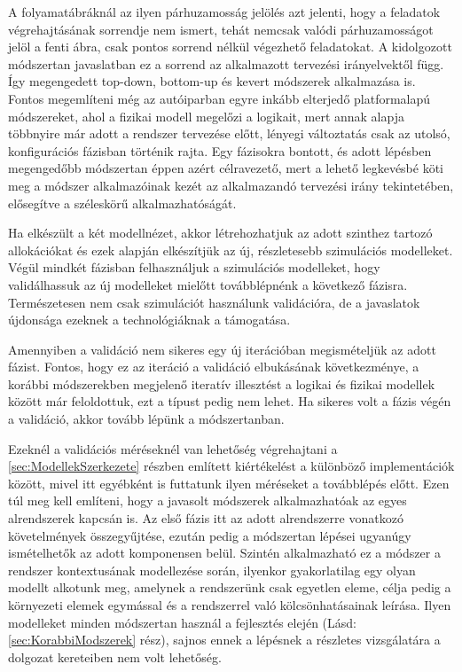         A folyamatábráknál az ilyen párhuzamosság jelölés azt jelenti, hogy a feladatok végrehajtásának sorrendje nem ismert, tehát nemcsak valódi párhuzamosságot jelöl a fenti ábra, csak pontos sorrend nélkül végezhető feladatokat.
        A kidolgozott módszertan javaslatban ez a sorrend az alkalmazott tervezési irányelvektől függ. Így megengedett top-down, bottom-up és kevert módszerek alkalmazása is. Fontos megemlíteni még az autóiparban egyre inkább elterjedő platformalapú módszereket, ahol a fizikai modell megelőzi a logikait, mert annak alapja többnyire már adott a rendszer tervezése előtt, lényegi változtatás csak az utolsó, konfigurációs fázisban történik rajta.
        Egy fázisokra bontott, és adott lépésben megengedőbb módszertan éppen azért célravezető, mert a lehető legkevésbé köti meg a módszer alkalmazóinak kezét az alkalmazandó tervezési irány tekintetében, elősegítve a széleskörű alkalmazhatóságát.
        
        Ha elkészült a két modellnézet, akkor létrehozhatjuk az adott szinthez tartozó allokációkat és ezek alapján elkészítjük az új, részletesebb szimulációs modelleket.
        Végül mindkét fázisban felhasználjuk a szimulációs modelleket, hogy validálhassuk az új modelleket mielőtt továbblépnénk a következő fázisra. Természetesen nem csak szimulációt használunk validációra, de a javaslatok újdonsága ezeknek a technológiáknak a támogatása.
        
        Amennyiben a validáció nem sikeres egy új iterációban megismételjük az adott fázist. Fontos, hogy ez az iteráció a validáció elbukásának következménye, a korábbi módszerekben megjelenő iteratív illesztést a logikai és fizikai modellek között már feloldottuk, ezt a típust pedig nem lehet.
        Ha sikeres volt a fázis végén a validáció, akkor tovább lépünk a módszertanban.
        
        Ezeknél a validációs méréseknél van lehetőség végrehajtani a \ref{sec:ModellekSzerkezete} részben említett kiértékelést a különböző implementációk között, mivel itt egyébként is futtatunk ilyen méréseket a továbblépés előtt.
        Ezen túl meg kell említeni, hogy a javasolt módszerek alkalmazhatóak az egyes alrendszerek kapcsán is. Az első fázis itt az adott alrendszerre vonatkozó követelmények összegyűjtése, ezután pedig a módszertan lépései ugyanúgy ismételhetők az adott komponensen belül.
        Szintén alkalmazható ez a módszer a rendszer kontextusának modellezése során, ilyenkor gyakorlatilag egy olyan modellt alkotunk meg, amelynek a rendszerünk csak egyetlen eleme, célja pedig a környezeti elemek egymással és a rendszerrel való kölcsönhatásainak leírása.
        Ilyen modelleket minden módszertan használ a fejlesztés elején (Lásd: \ref{sec:KorabbiModszerek} rész), sajnos ennek a lépésnek a részletes vizsgálatára a dolgozat kereteiben nem volt lehetőség.

